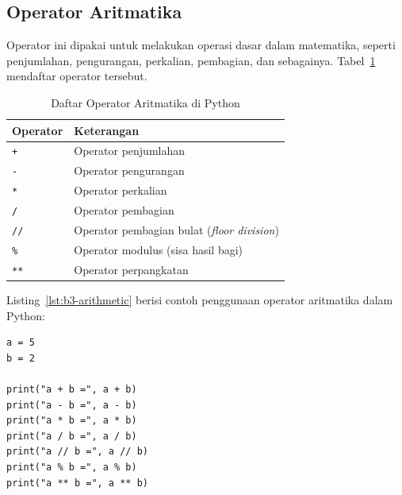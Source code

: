 \subsection{Operator Aritmatika}
Operator ini dipakai untuk melakukan operasi dasar dalam matematika, seperti penjumlahan, pengurangan, perkalian, pembagian, dan sebagainya. Tabel~\ref{tab:b3-aritmatika} mendaftar operator tersebut.

\begin{table}[H]
  \centering
  \caption{Daftar Operator Aritmatika di Python}
  \label{tab:b3-aritmatika}
  \begin{tabularx}{\textwidth}{lX}
    \hline
    \textbf{Operator} & \textbf{Keterangan} \\
    \hline
    \texttt{+} & Operator penjumlahan \\
    \hline
    \texttt{-} & Operator pengurangan \\
    \hline
    \texttt{*} & Operator perkalian \\
    \hline
    \texttt{/} & Operator pembagian \\
    \hline
    \texttt{//} & Operator pembagian bulat (\textit{floor division}) \\
    \hline
    \texttt{\%} & Operator modulus (sisa hasil bagi) \\
    \hline
    \texttt{**} & Operator perpangkatan \\
    \hline
  \end{tabularx}
\end{table}

Listing~\ref{lst:b3-arithmetic} berisi contoh penggunaan operator aritmatika dalam Python:
\begin{lstlisting}[style=PythonStyle, caption={Kode Python: arithmetic_operator.py}, label={lst:b3-arithmetic}]
a = 5
b = 2

print("a + b =", a + b)
print("a - b =", a - b)
print("a * b =", a * b)
print("a / b =", a / b)
print("a // b =", a // b)
print("a % b =", a % b)
print("a ** b =", a ** b)
\end{lstlisting}

